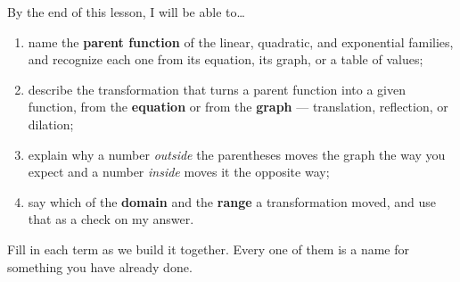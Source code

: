 \documentclass[10pt]{article}
\begin{document}

\vspace{0.15in}

\begin{objectivebox}
\small
By the end of this lesson, I will be able to\dots
\begin{enumerate}[leftmargin=1.5em, itemsep=2pt, topsep=3pt]
  \item name the \textbf{parent function} of the linear, quadratic, and exponential families, and
        recognize each one from its equation, its graph, or a table of values;
  \item describe the transformation that turns a parent function into a given function, from the
        \textbf{equation} or from the \textbf{graph} --- translation, reflection, or dilation;
  \item explain why a number \emph{outside} the parentheses moves the graph the way you expect and
        a number \emph{inside} moves it the opposite way;
  \item say which of the \textbf{domain} and the \textbf{range} a transformation moved, and use
        that as a check on my answer.
\end{enumerate}
\end{objectivebox}

\vspace{0.10in}

\boxguard
\begin{vocabbox}
\small
Fill in each term as we build it together. Every one of them is a name for something you have
already done.
\end{vocabbox}
\end{document}
